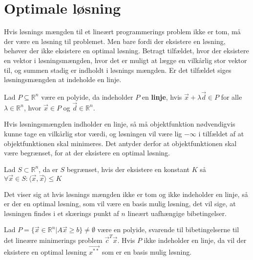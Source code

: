 \section{Optimale løsning}
Hvis løsnings mængden til et lineært programmerings problem ikke er tom, må der være en løsning til problemet.
Men bare fordi der eksistere en løsning, behøver der ikke eksistere en optimal løsning. 
Betragt tilfældet, hvor der eksistere en vektor i løsningsmængden, hvor det er muligt at lægge en vilkårlig stor vektor til, og summen stadig er indholdt i løsnings mængden.
Er det tilfældet siges løsningsmængden at indeholde en linje.
\begin{defn}[Linje]
Lad $P\subseteq \mathds{R}^n $ være en polyide, da indeholder $P$ en \textbf{linje}, hvis $\vec{x}+\lambda\vec{d} \in P$ for alle $\lambda \in \mathds{R}^n$, hvor $\vec{x}\in P$ og $\vec{d} \in \mathds{R}^n$.
\end{defn}
Hvis løsningsmængden indholder en linje, så må objektfunktion nødvendigvis kunne tage en vilkårlig stor værdi, og løsningen vil være lig $-\infty$ i tilfældet af at objektfunktionen skal minimeres. 
Det antyder derfor at objektfunktionen skal være begrænset, for at der eksistere en optimal løsning.
\begin{defn} [Begrænset]
Lad $S \subset \mathds{R}^n$, da er $S$ begrænset, hvis der eksistere en konstant $K$ så $\forall \vec{x} \in S: \langle \vec{x}, \vec{x} \rangle \leq K$
\end{defn}
Det viser sig at hvis løsnings mængden ikke er tom og ikke indeholder en linje, så er der en optimal løsning, som vil være en basis mulig løsning, det vil sige, at løsningen findes i et skærings punkt af $n$ lineært uafhængige bibetingelser.
\begin{stn}
Lad $P=\{\vec{x} \in \mathds{R}^n| A \vec{x} \geq b \} \neq \emptyset$ være en polyide, svarende til bibetingelserne til det lineære minimerings problem $\vec{c}^T\vec{x}$. Hvis $P$ ikke indeholder en linje, da vil der eksistere en optimal løsning $\vec{x^{**}}$ som er en basis mulig løsning.
\label{stn:eksistens}
\end{stn}
